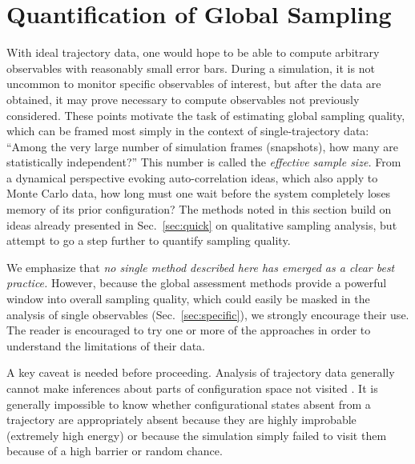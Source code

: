 %
%
%

\section{Quantification of Global Sampling}
\label{sec:global}


With ideal trajectory data, one would hope to be able to compute arbitrary observables with reasonably small error bars.
During a simulation, it is not uncommon to monitor specific observables of interest, but after the data are obtained, it may prove necessary to compute observables not previously considered.
These points motivate the task of estimating global sampling quality, which can be framed most simply in the context of single-trajectory data:
``Among the very large number of simulation frames (snapshots), how many are statistically independent?''
This number is called the \emph{effective sample size.}
From a dynamical perspective evoking auto-correlation ideas, which also apply to Monte Carlo data, how long must one wait before the system completely loses memory of its prior configuration?
The methods noted in this section build on ideas already presented in Sec.\ \ref{sec:quick} on qualitative sampling analysis, but attempt to go a step further to quantify sampling quality.

We emphasize that \emph{no single method described here has emerged as a clear best practice.}
However, because the global assessment methods provide a powerful window into overall sampling quality, which could easily be masked in the analysis of single observables (Sec.\ \ref{sec:specific}), we strongly encourage their use.
The reader is encouraged to try one or more of the approaches in order to understand the limitations of their data.


A key caveat is needed before proceeding.
Analysis of trajectory data generally cannot make inferences about parts of configuration space not visited \cite{Grossfield2009}.
It is generally impossible to know whether configurational states absent from a trajectory are appropriately absent because they are highly improbable (extremely high energy) or because the simulation simply failed to visit them because of a high barrier or random chance.

